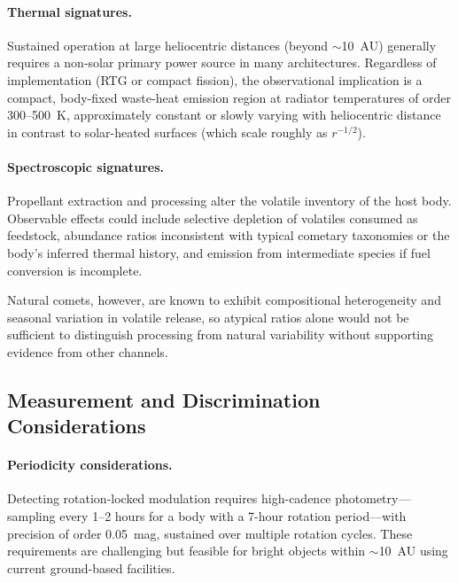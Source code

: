 \documentclass{article}
\begin{document}
\paragraph{Thermal signatures.}

Sustained operation at large heliocentric distances (beyond $\sim$10~AU) generally requires a non-solar primary power source in many architectures. Regardless of implementation (RTG or compact fission), the observational implication is a compact, body-fixed waste-heat emission region at radiator temperatures of order 300--500~K, approximately constant or slowly varying with heliocentric distance in contrast to solar-heated surfaces (which scale roughly as $r^{-1/2}$).

\paragraph{Spectroscopic signatures.}

Propellant extraction and processing alter the volatile inventory of the host body. Observable effects could include selective depletion of volatiles consumed as feedstock, abundance ratios inconsistent with typical cometary taxonomies or the body's inferred thermal history, and emission from intermediate species if fuel conversion is incomplete.

Natural comets, however, are known to exhibit compositional heterogeneity and seasonal variation in volatile release, so atypical ratios alone would not be sufficient to distinguish processing from natural variability without supporting evidence from other channels.


\subsection{Measurement and Discrimination Considerations}

\paragraph{Periodicity considerations.}

Detecting rotation-locked modulation requires high-cadence photometry---sampling every 1--2 hours for a body with a 7-hour rotation period---with precision of order 0.05~mag, sustained over multiple rotation cycles. These requirements are challenging but feasible for bright objects within $\sim$10~AU using current ground-based facilities.
\end{document}

